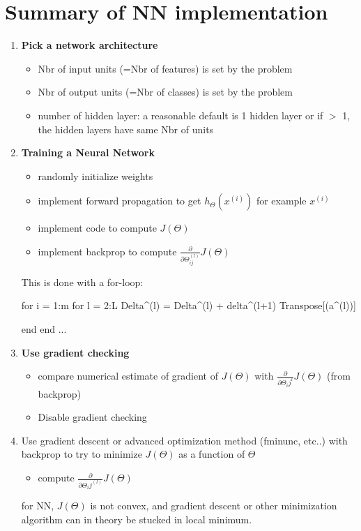 \documentclass[a4paper,12pt]{report}
\begin{document}
\section{Summary of NN implementation}
\begin{enumerate}
\item \textbf{Pick a network architecture}
	\begin{itemize}
	\item Nbr of input units (=Nbr of features) is set by the problem
	\item Nbr of output units (=Nbr of classes) is set by the problem
	\item number of hidden layer: a reasonable default is 1 hidden layer or if $>$ 1, the hidden layers have same Nbr of units 
	\end{itemize}
\item \textbf{Training a Neural Network}
	\begin{itemize}
	\item randomly initialize weights
	\item implement forward propagation to get $h_{\Theta}(x^{(i)})$ for example $x^{(i)}$
	\item implement code to compute $J(\Theta)$ 
	\item implement backprop to compute $\frac{\partial}{\partial \Theta_{ij} ^{(l)}} J(\Theta)$ 
	\end{itemize}
This is done with a for-loop:
\begin{tcolorbox}
\begin{python}
for i = 1:m 
	for l = 2:L
		Delta^(l) = Delta^(l) + delta^(l+1) Transpose[(a^(l))]
	
	end
end
...
\end{python}
\end{tcolorbox}

\item \textbf{Use gradient checking} \\
	\begin{itemize}
	\item compare numerical estimate of gradient of $J(\Theta)$ with $\frac{\partial}{\partial \Theta_ij ^{l}} J(\Theta)$ (from backprop)
	\item Disable gradient checking
	\end{itemize}
 
\item Use gradient descent or advanced optimization method (fminunc, etc..) with backprop to try to minimize $J(\Theta)$ as a function of $\Theta$
	\begin{itemize}
	\item compute $\frac{\partial }{\partial \Theta_ij ^{(l)}} J(\Theta)$
	\end{itemize}
for NN, $J(\Theta)$ is not convex, and gradient descent or other minimization algorithm can in theory be stucked in local minimum.
\end{enumerate}
\end{document}

